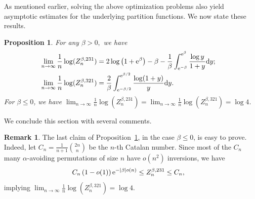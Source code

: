 \documentclass[a4paper,11pt]{amsart}
\newcommand{\dd}{\textup{d}}
\newcommand{\ee}{\textup{e}}
\newtheorem{prop}[thm]{Proposition}
\theoremstyle{definition}
\newtheorem{rem}[thm]{Remark}
\newcommand{\thom}[1]{{\color{blue}Thomas : #1}}
\newcommand{\chgts}[1]{{\color{blue} #1}}
\begin{document}
As mentioned earlier, solving the above optimization problems also yield
asymptotic estimates for the underlying partition functions. 
We now state these results.
\begin{prop}\label{prop:estimateZ}
For any $\beta > 0,$ we have 
\begin{align}
	\lim_{n \rightarrow \infty} \frac{1}{n} \log (Z_n^{\beta,231}) &= 2 \log \left( 1+ \ee^\beta \right) -\beta  - \frac{1}{\beta} \int_{\ee^{-\beta}}^{\ee^\beta} \frac{\log y}{1+y} \dd y;\label{eq:partition231}\\
	\lim_{n \rightarrow \infty} \frac{1}{n} \log (Z_n^{\beta,321}) &= \frac{2}{\beta} \int_{\ee^{-\beta/2}}^{\ee^{\beta/2}} \frac{\log(1+y)}{y} \dd y.\label{eq:partition321}
\end{align}
For $\beta \le 0$, we have $\lim_{n \rightarrow \infty} \frac{1}{n} \log (Z_n^{\beta,231})=\lim_{n \rightarrow \infty} \frac{1}{n} \log (Z_n^{\beta,321})=\log 4$.
\end{prop}

We conclude this section with several comments.
\begin{rem}\label{rmk:negative_beta}
The last claim of Proposition~\ref{prop:estimateZ}, in the case $\beta \le 0$, is easy to prove. Indeed, let $C_n=\frac{1}{n+1} \binom{2n}n$ be the $n$-th Catalan number.
Since most of the $C_n$ many $\alpha$-avoiding permutations of size $n$
have $o(n^2)$ inversions, we have
	\[ C_n \, (1-o(1)) \, \ee^{- |\beta| o(n)} \le Z_n^{\beta,231}  \le C_n,\]
implying $\lim_{n \rightarrow \infty} \frac{1}{n} \log (Z_n^{\beta,321}) =\log 4$.
\end{rem}

\end{document}
